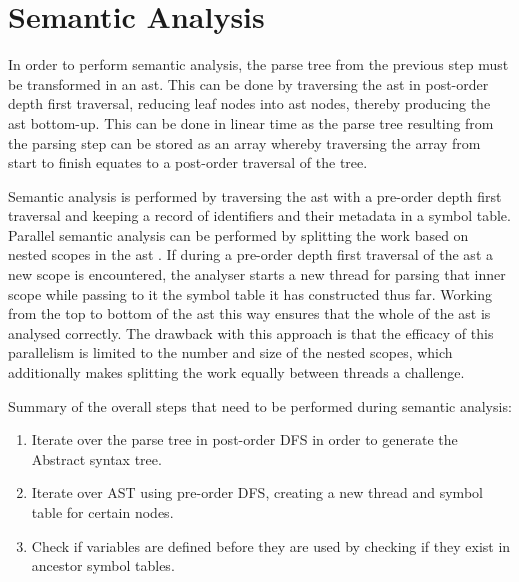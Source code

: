 \section{Semantic Analysis} \label{design_analyser}

In order to perform semantic analysis, the parse tree from the previous
step must be transformed in an \gls{ast}. This can be done by traversing the
\gls{ast} in post-order depth first traversal, reducing leaf nodes into ast nodes,
thereby producing the \gls{ast} bottom-up. This can be done in linear time as
the parse tree resulting from the parsing step can be stored as an array whereby
traversing the array from start to finish equates to a post-order traversal of
the tree. 

Semantic analysis is performed by traversing the \gls{ast} with a
pre-order depth first traversal and keeping a record of identifiers
and their metadata in a symbol table. Parallel semantic analysis can be
performed by splitting the work based on nested scopes in the \gls{ast}
\citep{seshadri_investigation_1991}. If during a pre-order depth first traversal
of the \gls{ast} a new scope is encountered, the analyser starts a new thread
for parsing that inner scope while passing to it the symbol table it has
constructed thus far. Working from the top to bottom of the \gls{ast} this way
ensures that the whole of the \gls{ast} is analysed correctly. The drawback with
this approach is that the efficacy of this parallelism is limited to the number
and size of the nested scopes, which additionally makes splitting the work
equally between threads a challenge.

Summary of the overall steps that need to be performed during semantic
analysis:

\begin{enumerate}
	\item Iterate over the parse tree in post-order DFS in order to generate the Abstract syntax tree.
	\item Iterate over AST using pre-order DFS, creating a new thread and symbol table for certain nodes.
	\item Check if variables are defined before they are used by checking if they exist in ancestor symbol tables.
\end{enumerate}




